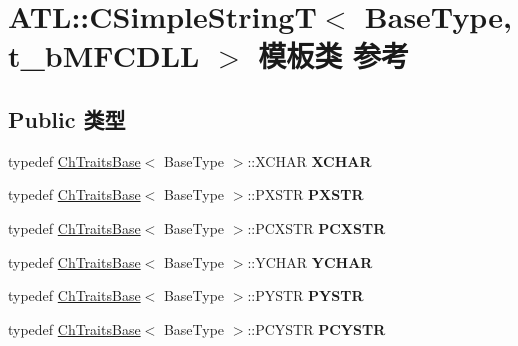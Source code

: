 \hypertarget{class_a_t_l_1_1_c_simple_string_t}{}\section{A\+TL\+:\+:C\+Simple\+StringT$<$ Base\+Type, t\+\_\+b\+M\+F\+C\+D\+LL $>$ 模板类 参考}
\label{class_a_t_l_1_1_c_simple_string_t}
\subsection*{Public 类型}
\begin{DoxyCompactItemize}
\item 
\mbox{\label{class_a_t_l_1_1_c_simple_string_t_af1d1ee9b3a932d4376f81e8928bf9297}} 
typedef \hyperlink{class_a_t_l_1_1_ch_traits_base}{Ch\+Traits\+Base}$<$ Base\+Type $>$\+::X\+C\+H\+AR {\bfseries X\+C\+H\+AR}
\item 
\mbox{\label{class_a_t_l_1_1_c_simple_string_t_a85371a123b978f3c6e0c4ff58e91e210}} 
typedef \hyperlink{class_a_t_l_1_1_ch_traits_base}{Ch\+Traits\+Base}$<$ Base\+Type $>$\+::P\+X\+S\+TR {\bfseries P\+X\+S\+TR}
\item 
\mbox{\label{class_a_t_l_1_1_c_simple_string_t_a5533fd08c783014c61738daa579dee38}} 
typedef \hyperlink{class_a_t_l_1_1_ch_traits_base}{Ch\+Traits\+Base}$<$ Base\+Type $>$\+::P\+C\+X\+S\+TR {\bfseries P\+C\+X\+S\+TR}
\item 
\mbox{\label{class_a_t_l_1_1_c_simple_string_t_a8458dd2d0e555a5970e8189f3f95019f}} 
typedef \hyperlink{class_a_t_l_1_1_ch_traits_base}{Ch\+Traits\+Base}$<$ Base\+Type $>$\+::Y\+C\+H\+AR {\bfseries Y\+C\+H\+AR}
\item 
\mbox{\label{class_a_t_l_1_1_c_simple_string_t_ac7e057929379b9f28f6fbde2870ec452}} 
typedef \hyperlink{class_a_t_l_1_1_ch_traits_base}{Ch\+Traits\+Base}$<$ Base\+Type $>$\+::P\+Y\+S\+TR {\bfseries P\+Y\+S\+TR}
\item 
\mbox{\label{class_a_t_l_1_1_c_simple_string_t_a70561a7412b2f8c995a8930e0201aa2b}} 
typedef \hyperlink{class_a_t_l_1_1_ch_traits_base}{Ch\+Traits\+Base}$<$ Base\+Type $>$\+::P\+C\+Y\+S\+TR {\bfseries P\+C\+Y\+S\+TR}
\end{DoxyCompactItemize}
